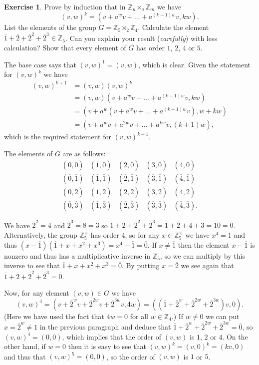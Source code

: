\documentclass{amsart}
\renewcommand{\:}{\colon}
\newcommand{\ov}{\overline}
\newcommand{\tm}{\times}
\newcommand{\Z}{\mathbb{Z}}
\theoremstyle{definition}
\newtheorem{exercise}{Exercise}
\newenvironment{solution}{{\noindent\bf Solution:}}{}
\begin{document}
\begin{exercise}
 Prove by induction that in $\Z_n\rtimes_a\Z_m$ we have
 \[ (v,w)^k = (v + a^w v + \ldots + a^{(k-1)w} v,kw). \]
 List the elements of the group $G=\Z_5\rtimes_2\Z_4$.  Calculate the
 element $\ov{1}+\ov{2}+\ov{2}^2+\ov{2}^3\in\Z_5$.  Can you explain
 your result (\emph{carefully}) with less calculation?  Show that
 every element of $G$ has order $1$, $2$, $4$ or $5$.
\end{exercise}
\begin{solution}
 The base case says that $(v,w)^1=(v,w)$, which is clear.  Given the
 statement for $(v,w)^k$ we have
 \begin{align*}
  (v,w)^{k+1} &= (v,w)(v,w)^k \\
   &= (v,w)(v + a^w v + \ldots + a^{(k-1)w} v,kw) \\
   &= (v + a^w(v + a^w v + \ldots + a^{(k-1)w} v),w+kw) \\
   &= (v + a^wv + a^{2w}v + \ldots + a^{kw}v,(k+1)w),
 \end{align*}
 which is the required statement for $(v,w)^{k+1}$.

 The elements of $G$ are as follows:
 \[ \renewcommand{\arraystretch}{1.5}
  \begin{array}{ccccc}
  (\ov{0},\ov{0}) & (\ov{1},\ov{0}) & (\ov{2},\ov{0}) &
                    (\ov{3},\ov{0}) & (\ov{4},\ov{0}) \\
  (\ov{0},\ov{1}) & (\ov{1},\ov{1}) & (\ov{2},\ov{1}) & 
                    (\ov{3},\ov{1}) & (\ov{4},\ov{1}) \\
  (\ov{0},\ov{2}) & (\ov{1},\ov{2}) & (\ov{2},\ov{2}) & 
                    (\ov{3},\ov{2}) & (\ov{4},\ov{2}) \\
  (\ov{0},\ov{3}) & (\ov{1},\ov{3}) & (\ov{2},\ov{3}) & 
                    (\ov{3},\ov{3}) & (\ov{4},\ov{3}).
 \end{array} \]
 
 We have $\ov{2}^2=\ov{4}$ and $\ov{2}^3=\ov{8}=\ov{3}$ so
 $\ov{1}+\ov{2}+\ov{2}^2+\ov{2}^3=\ov{1}+\ov{2}+\ov{4}+\ov{3}=\ov{10}=\ov{0}$.
 Alternatively, the group $\Z_5^\tm$ has order $4$, so for any
 $x\in\Z_5^\tm$ we have $x^4=1$ and thus
 $(x-\ov{1})(\ov{1}+x+x^2+x^3)=x^4-\ov{1}=\ov{0}$.  If $x\neq\ov{1}$
 then the element $x-\ov{1}$ is nonzero and thus has a multiplicative
 inverse in $\Z_5$, so we can multiply by this inverse to see that
 $\ov{1}+x+x^2+x^3=\ov{0}$.  By putting $x=\ov{2}$ we see again that
 $\ov{1}+\ov{2}+\ov{2}^2+\ov{2}^3=\ov{0}$.  

 Now, for any element $(v,w)\in G$ we have 
 \[ (v,w)^4=(v+\ov{2}^w v+\ov{2}^{2w} v+\ov{2}^{3w} v,4w)
           = ((\ov{1} + \ov{2}^w + \ov{2}^{2w} + \ov{2}^{3w})v,0).
 \]
 (Here we have used the fact that $4w=0$ for all $w\in\Z_4$.)  If
 $w\neq 0$ we can put $x=\ov{2}^w\neq 1$ in the previous paragraph and
 deduce that $\ov{1} + \ov{2}^w + \ov{2}^{2w} + \ov{2}^{3w}=\ov{0}$,
 so $(v,w)^4=(0,0)$, which implies that the order of $(v,w)$ is $1$,
 $2$ or $4$.  On the other hand, if $w=0$ then it is easy to see that
 $(v,w)^k=(v,0)^k=(kv,0)$ and thus that $(v,w)^5=(0,0)$, so the order
 of $(v,w)$ is $1$ or $5$.
\end{solution}
\end{document}
